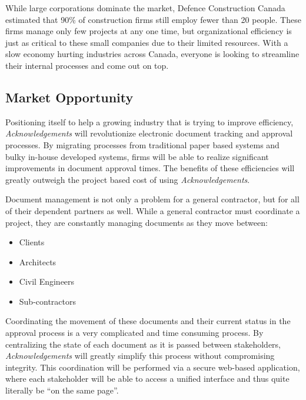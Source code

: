 While large corporations dominate the market, Defence Construction Canada estimated that 90\% of construction firms still employ fewer than 20 people. These firms manage only few projects at any one time, but organizational efficiency is just as critical to these small companies due to their limited resources. With a slow economy hurting industries across Canada, everyone is looking to streamline their internal processes and come out on top.

\subsection{Market Opportunity}
Positioning itself to help a growing industry that is trying to improve efficiency, {\it Acknowledgements} will revolutionize electronic document tracking and approval processes. By migrating processes from traditional paper based systems and bulky in-house developed systems, firms will be able to realize significant improvements in document approval times. The benefits of these efficiencies will greatly outweigh the project based cost of using {\it Acknowledgements}.

Document management is not only a problem for a general contractor, but for all of their dependent partners as well. While a general contractor must coordinate a project, they are constantly managing documents as they move between:

\begin{itemize}
	\item Clients
	\item Architects
	\item Civil Engineers
	\item Sub-contractors
\end{itemize}

Coordinating the movement of these documents and their current status in the approval process is a very complicated and time consuming process. By centralizing the state of each document as it is passed between stakeholders, {\it Acknowledgements} will greatly simplify this process without compromising integrity. This coordination will be performed via a secure web-based application, where each stakeholder will be able to access a unified interface and thus quite literally be ``on the same page''.